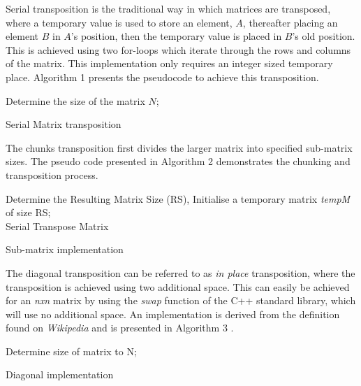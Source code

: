 \documentclass[a4paper, 11pt, onecolumn, conference]{IEEEtran}      %
\begin{document}
Serial transposition is the traditional way in which matrices are transposed, where a temporary value is used to store an element, $A$, thereafter placing an element $B$ in $A$'s position, then the temporary value is placed in $B$'s old position\cite{learn_c_c_nodate}. This is achieved using two for-loops which iterate through the rows and columns of the matrix\cite{learn_c_c_nodate}. This implementation only requires an integer sized temporary place. Algorithm 1 presents the pseudocode to achieve this transposition.\\

\begin{algorithm}
\SetAlgoLined
{}
Determine the size of the matrix $N$;\\
\caption{Serial Matrix transposition}
\end{algorithm}

The chunks transposition first divides the larger matrix into specified sub-matrix sizes. The pseudo code presented in Algorithm 2 demonstrates the chunking and transposition process.
\begin{algorithm}
\SetAlgoLined
{}
 Determine the Resulting Matrix Size (RS), Initialise a temporary matrix \textit{tempM} of size RS;\\
 Serial Transpose Matrix
 \caption{Sub-matrix implementation}
\end{algorithm}

The diagonal transposition can be referred to as \textit{in place} transposition, where the transposition is achieved using two additional space\cite{noauthor_-place_2019}. This can easily be achieved for an \textit{nxn} matrix by using the \textit{swap} function of the C++ standard library, which will use no additional space\cite{noauthor_-place_2019}. An implementation is derived from the definition found on \textit{Wikipedia} and is presented in Algorithm 3 \cite{noauthor_-place_2019}.

\begin{algorithm}
\SetAlgoLined
{}
 Determine size of matrix to N;\\
 \caption{Diagonal implementation}
\end{algorithm}
\end{document}

